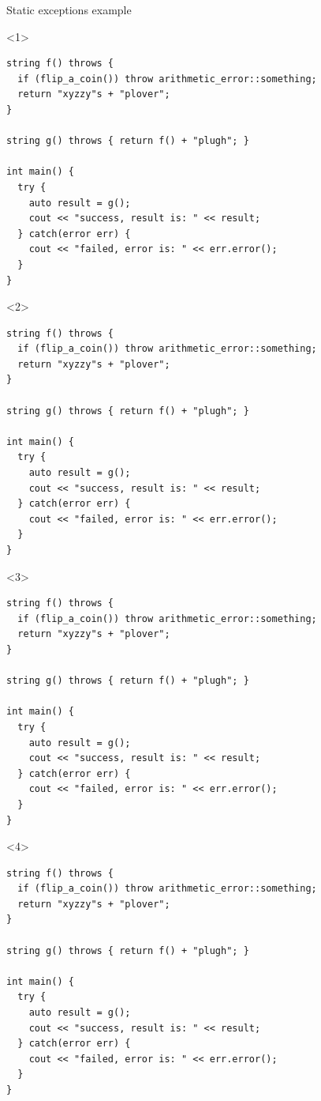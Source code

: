 \documentclass[10pt]{beamer}
\begin{document}
\begin{frame}[fragile]{Static exceptions example}
	\begin{onlyenv}
	\begin{verbatim}
string f() throws {
  if (flip_a_coin()) throw arithmetic_error::something;
  return "xyzzy"s + "plover"; 
}

string g() throws { return f() + "plugh"; } 

int main() {
  try {
    auto result = g();
    cout << "success, result is: " << result;
  } catch(error err) {
    cout << "failed, error is: " << err.error();
  }
}
	\end{verbatim}
	\end{onlyenv}

	\begin{onlyenv}
	\begin{verbatim}
string f() throws {
  if (flip_a_coin()) throw arithmetic_error::something;
  return "xyzzy"s + "plover"; 
}

string g() throws { return f() + "plugh"; } 

int main() {
  try {
    auto result = g();
    cout << "success, result is: " << result;
  } catch(error err) {
    cout << "failed, error is: " << err.error();
  }
}
	\end{verbatim}
	\end{onlyenv}

	\begin{onlyenv}
	
	\begin{verbatim}
string f() throws {
  if (flip_a_coin()) throw arithmetic_error::something;
  return "xyzzy"s + "plover"; 
}

string g() throws { return f() + "plugh"; } 

int main() {
  try {
    auto result = g();
    cout << "success, result is: " << result;
  } catch(error err) {
    cout << "failed, error is: " << err.error();
  }
}
	\end{verbatim}
	\end{onlyenv}

	\begin{onlyenv}
	\begin{verbatim}
string f() throws {
  if (flip_a_coin()) throw arithmetic_error::something;
  return "xyzzy"s + "plover"; 
}

string g() throws { return f() + "plugh"; } 

int main() {
  try {
    auto result = g();
    cout << "success, result is: " << result;
  } catch(error err) {
    cout << "failed, error is: " << err.error();
  }
}
	\end{verbatim}
	\end{onlyenv}

\end{frame}
\end{document}
